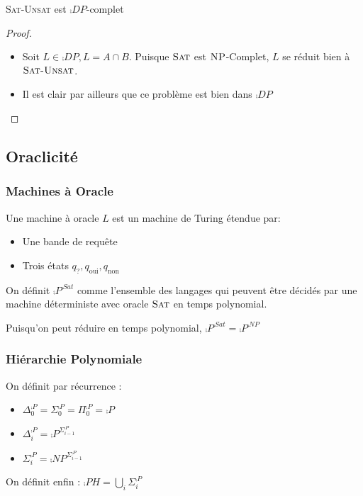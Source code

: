 \documentclass{cours}
\begin{document}
\begin{proposition}
    \textsc{Sat-Unsat} est $\comp{DP}$-complet
\end{proposition}
\begin{proof}
    \begin{itemize}
        \item Soit $L \in \comp{DP}, L = A\cap B$. Puisque $\textsc{Sat}$ est $\textsc{NP}$-Complet, $L$ se réduit bien à $\textsc{Sat-Unsat}$. 
        \item Il est clair par ailleurs que ce problème est bien dans $\comp{DP}$
    \end{itemize}
\end{proof}

\subsection{Oraclicité}
\subsubsection{Machines à Oracle}
\begin{definition}
    Une machine à oracle $L$ est un machine de Turing étendue par: 
    \begin{itemize}
        \item Une bande de requête
        \item Trois états $q_{?}, q_{\text{oui}}, q_{\text{non}}$
    \end{itemize}
\end{definition}

\begin{definition}
    On définit $\comp{P}^{\comp{Sat}}$ comme l'ensemble des langages qui peuvent être décidés par une machine déterministe avec oracle $\textsc{Sat}$ en temps polynomial. 
\end{definition}

\begin{proposition}
    Puisqu'on peut réduire  en temps polynomial, $\comp{P}^{\comp{Sat}} = \comp{P}^{\comp{NP}}$
\end{proposition}

\subsubsection{Hiérarchie Polynomiale}
\begin{definition}
    On définit par récurrence : 
    \begin{itemize}
        \item $\Delta_{0}^{\comp{P}} = \Sigma_{0}^{\comp{P}} = \Pi_{0}^{\comp{P}} = \comp{P}$
        \item $\Delta_{i}^{\comp{P}} = \comp{P}^{\Sigma_{i - 1}^{\comp{P}}}$
        \item $\Sigma_{i}^{\comp{P}} = \comp{NP}^{\Sigma_{i - 1}^{\comp{P}}}$
    \end{itemize}
    On définit enfin : $\comp{PH} = \bigcup_{i}\Sigma_{i}^{\comp{P}}$
\end{definition}
\end{document}

